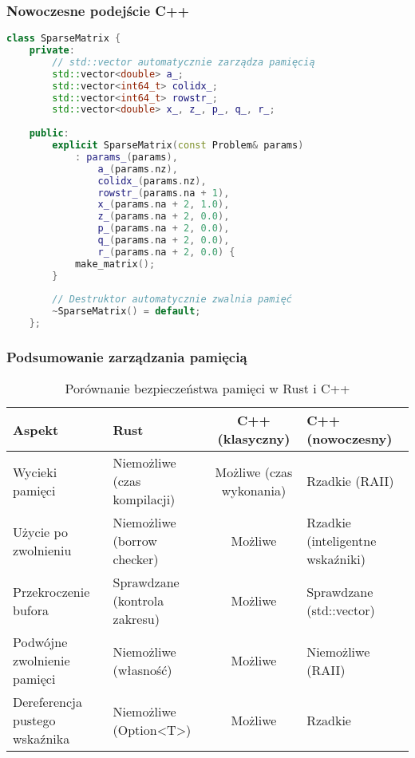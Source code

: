 \subsubsection{Nowoczesne podejście C++}
\begin{lstlisting}[language=C++, caption={Zarządzanie pamięcią w nowoczesnym C++}, label={lst:cg_modern_cpp_memory}]
class SparseMatrix {
    private:
        // std::vector automatycznie zarządza pamięcią
        std::vector<double> a_;
        std::vector<int64_t> colidx_;
        std::vector<int64_t> rowstr_;
        std::vector<double> x_, z_, p_, q_, r_;
        
    public:
        explicit SparseMatrix(const Problem& params) 
            : params_(params),
                a_(params.nz),
                colidx_(params.nz),
                rowstr_(params.na + 1),
                x_(params.na + 2, 1.0),
                z_(params.na + 2, 0.0),
                p_(params.na + 2, 0.0),
                q_(params.na + 2, 0.0),
                r_(params.na + 2, 0.0) {
            make_matrix();
        }
        
        // Destruktor automatycznie zwalnia pamięć
        ~SparseMatrix() = default;
    };
\end{lstlisting}

\subsubsection{Podsumowanie zarządzania pamięcią}
\begin{table}[H]
    \centering
    \caption{Porównanie bezpieczeństwa pamięci w Rust i C++}
    \begin{tabular}{|>{\centering}m{3cm}|>{\centering}m{3cm}|c|>{\centering\arraybackslash}m{3.5cm}|}
    \hline
    \textbf{Aspekt} & \textbf{Rust} & \textbf{C++ (klasyczny)} & \textbf{C++ (nowoczesny)} \\
    \hline
    Wycieki pamięci & Niemożliwe (czas kompilacji) & Możliwe (czas wykonania) & Rzadkie (RAII) \\ \hline
    Użycie po zwolnieniu & Niemożliwe (borrow checker) & Możliwe & Rzadkie (inteligentne wskaźniki) \\ \hline
    Przekroczenie bufora & Sprawdzane (kontrola zakresu) & Możliwe & Sprawdzane (std::vector) \\ \hline
    Podwójne zwolnienie pamięci & Niemożliwe (własność) & Możliwe & Niemożliwe (RAII) \\ \hline
    Dereferencja pustego wskaźnika & Niemożliwe (Option\textless T\textgreater) & Możliwe & Rzadkie \\
    \hline
    \end{tabular}

\end{table}

